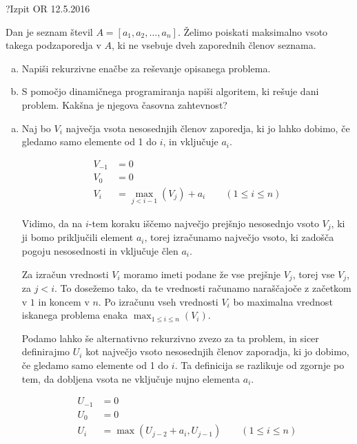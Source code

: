 \begin{naloga}{?}{Izpit OR 12.5.2016}
\begin{vprasanje}
Dan je seznam števil $A = [a_1, a_2, \dots, a_n]$.
Želimo poiskati maksimalno vsoto takega podzaporedja v $A$,
ki ne vsebuje dveh zaporednih členov seznama.

\begin{enumerate}[(a)]
\item Napiši rekurzivne enačbe za reševanje opisanega problema.

\item S pomočjo dinamičnega programiranja napiši algoritem,
ki rešuje dani problem.
Kakšna je njegova časovna zahtevnost?
\end{enumerate}
\end{vprasanje}
\begin{odgovor}

\begin{enumerate}[(a)]

\item Naj bo $V_i$ največja vsota nesosednjih členov zaporedja, ki jo lahko dobimo,
če gledamo samo elemente od 1 do $i$, in vključuje $a_i$.

\begin{align*}
V_{-1} &= 0 \\
V_0 &= 0 \\
V_i &= \max_{j < i - 1}\left(V_j\right) + a_i
\qquad (1 \le i \le n)
\end{align*}

Vidimo, da na $i$-tem koraku iščemo največjo prejšnjo nesosednjo vsoto $V_j$,
ki ji bomo priključili element $a_i$, torej izračunamo največjo vsoto, 
ki zadošča pogoju nesosednosti in vključuje člen $a_i$.

Za izračun vrednosti $V_i$ moramo imeti podane že vse prejšnje $V_j$, torej vse $V_j$, za $j < i$.
To dosežemo tako, da te vrednosti računamo naraščajoče z začetkom v $1$ in koncem v $n$.
Po izračunu vseh vrednosti $V_i$ bo maximalna vrednost iskanega problema enaka $\max_{1 \leq i \leq n}(V_i)$.

Podamo lahko še alternativno rekurzivno zvezo za ta problem, in sicer 
definirajmo $U_i$ kot največjo vsoto nesosednjih členov zaporadja, 
ki jo dobimo, če gledamo samo elemente od 1 do $i$.
Ta definicija se razlikuje od zgornje po tem, da dobljena vsota ne vključuje nujno elementa $a_i$.

\begin{align*}
U_{-1} &= 0 \\
U_0 &= 0 \\
U_i &= \max\left(U_{j - 2} + a_i, U_{j - 1}\right)
\qquad (1 \le i \le n)
\end{align*}


\end{enumerate}
\end{odgovor}
\end{naloga}
